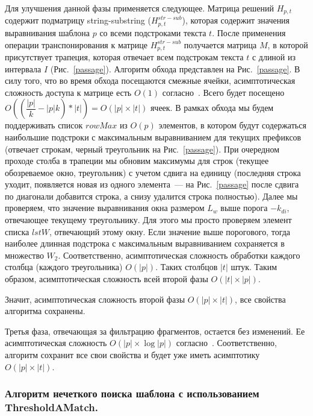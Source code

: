 Для улучшения данной фазы применяется следующее.
Матрица решений $H_{p,t}$ содержит подматрицу {string-substring} ($H^{str-sub}_{p,t}$), которая содержит значения выравнивания шаблона $p$ со всеми подстроками текста $t$.
После применения операции транспонирования к матрице $H^{str-sub}_{p,t}$ получается матрица $M$, в которой присутствует трапеция, которая отвечает всем подстрокам текста $t$ с длиной из интервала $I$ (Рис.~\ref{passage}).
Алгоритм обхода представлен на Рис.~\ref{passage}.
В силу того, что во время обхода посещаются смежные ячейки, асимптотическая сложность доступа к матрице есть $O(1)$ согласно~\cite{tiskin2008semi}.
Всего будет посещено $O((\dfrac{|p|}{k}-|p|k)*|t|)=O(|p|\times|t|)$ ячеек.
В рамках обхода мы будем поддерживать список $rowMax$ из $O(p)$ элементов, в котором будут содержаться наибольшие подстроки с максимальным выравниванием для текущих префиксов (отвечает строкам, черный треугольник на Рис.~\ref{passage}).
При очередном  проходе столба в трапеции мы обновим максимумы для строк (текущее обозреваемое окно, треугольник) с учетом сдвига на единицу (последняя строка уходит, появляется новая из одного элемента~--- на Рис.~\ref{passage} после сдвига по диагонали добавится строка, а снизу удалится строка полностью).
Далее мы проверяем, что значение выравнивания окна размером $L_{w}$ выше порога $-k_{di}$, отвечающее текущему треугольнику. Для этого мы просто проверяем элемент списка $lstW$, отвечающий этому окну.
Если значение выше порогового, тогда наиболее длинная подстрока с максимальным выравниванием сохраняется в множество $W_{2}$.
Соответственно, асимптотическая сложность обработки каждого столбца (каждого треугольника)  $O(|p|)$.
Таких столбцов $|t|$ штук.
Таким образом, асимптотическая сложность всей второй фазы $O(|t| \times |p|)$.

Значит, асимптотическая сложность второй фазы $O(|p| \times |t|)$, все свойства алгоритма сохранены.

Третья фаза, отвечающая за фильтрацию фрагментов, остается без изменений. Ее асимптотическая сложность $O(|p| \times \log |p|)$ согласно~\cite{luciv2019interactive}.
Соответственно, алгоритм сохранит все свои свойства и будет уже иметь асимптотику $O(|p| \times |t|)$.

\subsubsection{Алгоритм нечеткого поиска шаблона с использованием ThresholdAMatch.}

